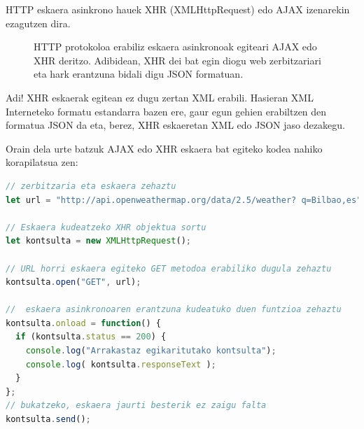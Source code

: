 HTTP eskaera asinkrono hauek XHR (XMLHttpRequest) edo AJAX  izenarekin ezagutzen dira.

\begin{figure}[ht]
	\centering
{}
\caption{HTTP protokoloa erabiliz eskaera asinkronoak egiteari AJAX edo XHR deritzo. Adibidean, XHR dei bat egin diogu web zerbitzariari eta hark erantzuna bidali digu JSON formatuan.}
\label{fig:XHR}
\end{figure}

Adi!  XHR eskaerak egitean ez dugu zertan XML erabili. Hasieran XML Interneteko formatu estandarra bazen ere, gaur egun gehien erabiltzen den formatua JSON da eta, berez, XHR eskaeretan XML edo JSON jaso dezakegu.

Orain dela urte batzuk AJAX edo XHR eskaera bat egiteko kodea nahiko korapilatsua zen:

\begin{minipage}{\linewidth}
\begin{lstlisting}[language=JavaScript]
// zerbitzaria eta eskaera zehaztu
let url = "http://api.openweathermap.org/data/2.5/weather? q=Bilbao,es";

// Eskaera kudeatzeko XHR objektua sortu
let kontsulta = new XMLHttpRequest();

// URL horri eskaera egiteko GET metodoa erabiliko dugula zehaztu
kontsulta.open("GET", url);

//  eskaera asinkronoaren erantzuna kudeatuko duen funtzioa zehaztu
kontsulta.onload = function() {
  if (kontsulta.status == 200) {
    console.log("Arrakastaz egikaritutako kontsulta");
    console.log( kontsulta.responseText );
  }
};
// bukatzeko, eskaera jaurti besterik ez zaigu falta 
kontsulta.send();
\end{lstlisting}
\end{minipage}

